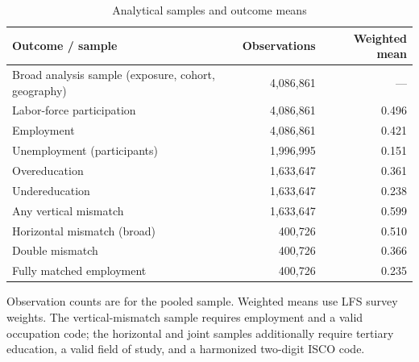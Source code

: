 \begin{table}[htbp]
  \centering
  \caption{Analytical samples and outcome means}
  \label{tab:appsamples}
  \begin{threeparttable}
  \begin{tabular}{L{6.4cm}rr}
    \toprule
    Outcome / sample & Observations & Weighted mean \\
    \midrule
    Broad analysis sample (exposure, cohort, geography) & 4{,}086{,}861 & --- \\
    \addlinespace
    Labor-force participation      & 4{,}086{,}861 & 0.496 \\
    Employment                     & 4{,}086{,}861 & 0.421 \\
    Unemployment (participants)     & 1{,}996{,}995 & 0.151 \\
    \addlinespace
    Overeducation                  & 1{,}633{,}647 & 0.361 \\
    Undereducation                 & 1{,}633{,}647 & 0.238 \\
    Any vertical mismatch          & 1{,}633{,}647 & 0.599 \\
    \addlinespace
    Horizontal mismatch (broad)    & 400{,}726 & 0.510 \\
    Double mismatch                & 400{,}726 & 0.366 \\
    Fully matched employment       & 400{,}726 & 0.235 \\
    \bottomrule
  \end{tabular}
  \begin{tablenotes}[flushleft]
    \footnotesize
    \item Observation counts are for the pooled sample. Weighted means use LFS survey weights.
    The vertical-mismatch sample requires employment and a valid occupation code; the horizontal
    and joint samples additionally require tertiary education, a valid field of study, and a
    harmonized two-digit ISCO code.
  \end{tablenotes}
  \end{threeparttable}
\end{table}

